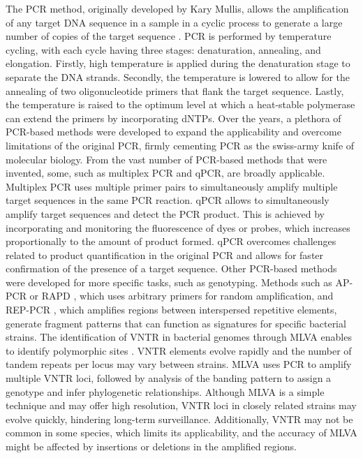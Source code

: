 The \ac{PCR} method, originally developed by Kary Mullis, allows the amplification of any target \ac{DNA} sequence in a sample in a cyclic process to generate a large number of copies of the target sequence \cite{mullis_specific_1986}. \ac{PCR} is performed by temperature cycling, with each cycle having three stages: denaturation, annealing, and elongation. Firstly, high temperature is applied during the denaturation stage to separate the \ac{DNA} strands. Secondly, the temperature is lowered to allow for the annealing of two oligonucleotide primers that flank the target sequence. Lastly, the temperature is raised to the optimum level at which a heat-stable polymerase can extend the primers by incorporating \ac{dNTP}s. Over the years, a plethora of \ac{PCR}-based methods were developed to expand the applicability and overcome limitations of the original \ac{PCR}, firmly cementing \ac{PCR} as the swiss-army knife of molecular biology.
From the vast number of \ac{PCR}-based methods that were invented, some, such as multiplex \ac{PCR} and \ac{qPCR}, are broadly applicable. Multiplex \ac{PCR} \cite{chamberlain_deletion_1988} uses multiple primer pairs to simultaneously amplify multiple target sequences in the same \ac{PCR} reaction.
\ac{qPCR} \cite{higuchi_simultaneous_1992, kubista_real-time_2006} allows to simultaneously amplify target sequences and detect the \ac{PCR} product. This is achieved by incorporating and monitoring the fluorescence of dyes or probes, which increases proportionally to the amount of product formed. \ac{qPCR} overcomes challenges related to product quantification in the original \ac{PCR} and allows for faster confirmation of the presence of a target sequence.
Other \ac{PCR}-based methods were developed for more specific tasks, such as genotyping. Methods such as \ac{AP-PCR or RAPD} \cite{welsh_fingerprinting_1990, williams_dna_1990}, which uses arbitrary primers for random amplification, and \ac{REP-PCR} \cite{versalovic_distribution_1991, de_bruijn_use_1992}, which amplifies regions between interspersed repetitive elements, generate fragment patterns that can function as signatures for specific bacterial strains. The identification of \ac{VNTR} in bacterial genomes through \ac{MLVA} enables to identify polymorphic sites \cite{lindstedt_multiple-locus_2005}. \ac{VNTR} elements evolve rapidly and the number of tandem repeats per locus may vary between strains. \ac{MLVA} uses \ac{PCR} to amplify multiple \ac{VNTR} loci, followed by analysis of the banding pattern to assign a genotype and infer phylogenetic relationships. Although \ac{MLVA} is a simple technique and may offer high resolution, \ac{VNTR} loci in closely related strains may evolve quickly, hindering long-term surveillance. Additionally, \ac{VNTR} may not be common in some species, which limits its applicability, and the accuracy of \ac{MLVA} might be affected by insertions or deletions in the amplified regions.
